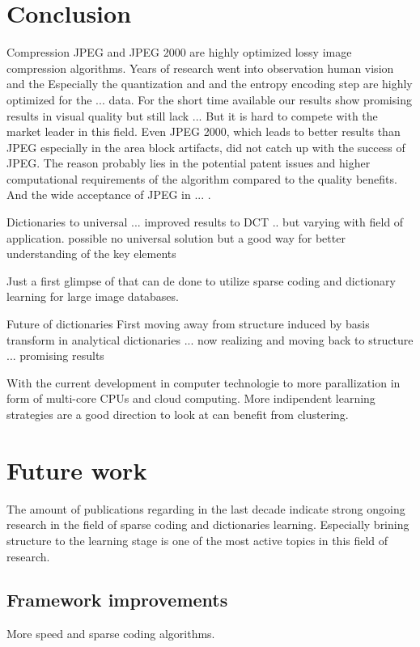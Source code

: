 \section{Conclusion}
Compression 
JPEG and JPEG 2000 are highly optimized lossy image compression algorithms. 
Years of research went into observation human vision and the 
Especially the quantization and and the entropy encoding step are highly
optimized for the ... data.
For the short time available our results show promising results in visual
quality but still lack ...
But it is hard to compete with the market leader in this field.  Even JPEG 2000,
which leads to better results than JPEG especially in the area block artifacts,
did not catch up with the success of JPEG. 
The reason probably lies in the potential patent issues and higher computational
requirements of the algorithm compared
to the quality benefits. And the wide acceptance of JPEG in ...
.


Dictionaries to universal ... improved results to DCT .. but varying with field
of application. possible no universal solution but a good way for better
understanding of the key elements 

Just a first glimpse of that can de done to utilize sparse coding and
dictionary learning for large image databases.

Future of dictionaries
First moving away from structure induced by basis transform in analytical
dictionaries ... now realizing and moving back to structure ... promising
results\cite{?,?,?}

With the current development in computer technologie to more
parallization in form of multi-core CPUs and cloud computing. 
More indipendent learning strategies are a good direction to look at can
benefit from clustering. 



\section{Future work}
The amount of publications regarding in the last decade indicate strong ongoing
research in the field of sparse coding and dictionaries learning. Especially
brining structure to the learning stage is one of the most active topics in this
field of research. 

\subsection{Framework improvements}
More speed and sparse coding algorithms.
